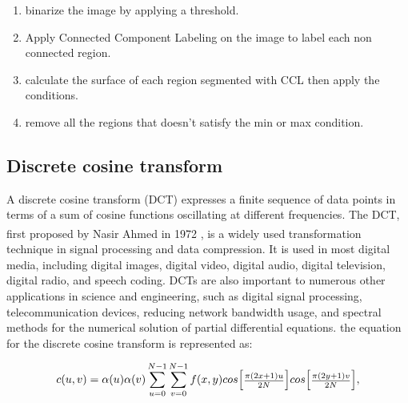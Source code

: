 \begin{enumerate}
    \item binarize the image by applying a threshold.
    \item Apply Connected Component Labeling on the image to label each non connected region.
    \item calculate the surface of each region segmented with CCL then apply the conditions.
    \item remove all the regions that doesn't satisfy the min or max condition.
\end{enumerate}

\subsection{Discrete cosine transform}
\hspace{\parindent}
A discrete cosine transform (DCT) expresses a finite sequence of data points in terms of a sum of cosine functions oscillating at different frequencies. The DCT, first proposed by Nasir Ahmed in 1972 \textsuperscript{\cite{ahmed1974discrete}}, is a widely used transformation technique in signal processing and data compression. It is used in most digital media, including digital images, digital video, digital audio, digital television, digital radio, and speech coding. DCTs are also important to numerous other applications in science and engineering, such as digital signal processing, telecommunication devices, reducing network bandwidth usage, and spectral methods for the numerical solution of partial differential equations.
the equation for the discrete cosine transform is represented as:

\begin{equation}
    c(u,v)=\alpha (u)\alpha (v)\sum_{u=0}^{N-1}\sum_{v=0}^{N-1} f(x,y) cos {\begin{bmatrix} {{\pi (2x + 1)u}\over{2N}} \end{bmatrix}} cos {\begin{bmatrix} {{\pi (2y + 1)v}\over{2N}} \end{bmatrix}} ,
    \label{eq:Discrete cosine transform equation}
\end{equation}

